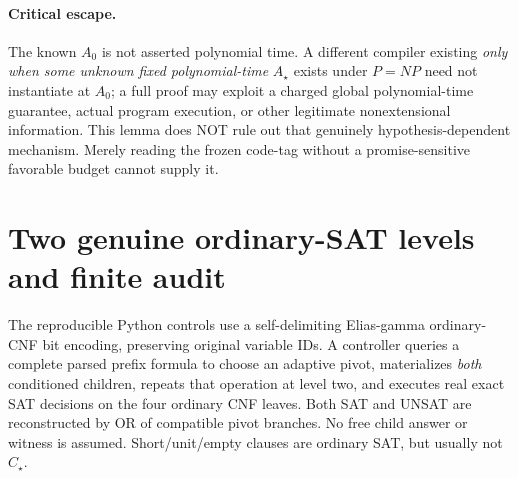 \documentclass[11pt]{article}
\begin{document}
\paragraph{Critical escape.} The known $A_0$ is not asserted polynomial time. A different compiler existing \emph{only when some unknown fixed polynomial-time} $A_\star$ exists under $P=NP$ need not instantiate at $A_0$; a full proof may exploit a charged global polynomial-time guarantee, actual program execution, or other legitimate nonextensional information. This lemma does NOT rule out that genuinely hypothesis-dependent mechanism. Merely reading the frozen code-tag without a promise-sensitive favorable budget cannot supply it.

\section{Two genuine ordinary-SAT levels and finite audit}
The reproducible Python controls use a self-delimiting Elias-gamma ordinary-CNF bit encoding, preserving original variable IDs. A controller queries a complete parsed prefix formula to choose an adaptive pivot, materializes \emph{both} conditioned children, repeats that operation at level two, and executes real exact SAT decisions on the four ordinary CNF leaves. Both SAT and UNSAT are reconstructed by OR of compatible pivot branches. No free child answer or witness is assumed. Short/unit/empty clauses are ordinary SAT, but usually not $C_\star$.
\end{document}
